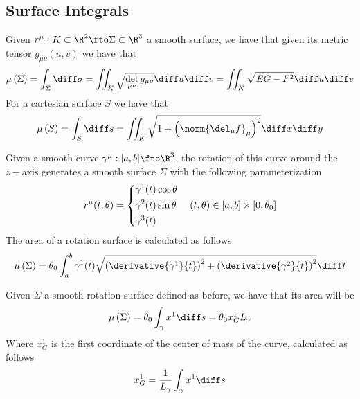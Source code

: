 \documentclass[../mmf.tex]{subfiles}
\begin{document}
\subsection{Surface Integrals}
\begin{dfn}
	Given $r^\mu:K\subset\R^2\fto\Sigma\subset\R^3$ a smooth surface, we have that given its metric tensor $g_{\mu\nu}(u,v)$ we have that
	\begin{equation}
		\mu\left( \Sigma \right)=\int_{\Sigma}^{}\diff\sigma=\iint_K\sqrt{\det_{\mu\nu}g_{\mu\nu}}\diff u\diff v=\iint_K\sqrt{EG-F^2}\diff u\diff v
		\label{eq:measuresurface}
	\end{equation}
	For a cartesian surface $S$ we have that
	\begin{equation}
		\mu\left( S \right)=\int_{S}^{}\diff s=\iint_K\sqrt{1+\left(\norm{\del_\mu f}_\mu\right)^2}\diff x\diff y
		\label{eq:cartesiansurf}
	\end{equation}
\end{dfn}
\begin{dfn}
	Given a smooth curve $\gamma^\mu:[a,b]\fto\R^3$, the rotation of this curve around the $z-$axis generates a smooth surface $\Sigma$ with the following parameterization
	\begin{equation}
		r^\mu(t,\theta)=\begin{dcases}\gamma^1(t)\cos\theta\\\gamma^2(t)\sin\theta\\\gamma^3(t)\end{dcases}\quad(t,\theta)\in[a,b]\times[0,\theta_0]
		\label{eq:rotationsurf}
	\end{equation}
	The area of a rotation surface is calculated as follows
	\begin{equation}
		\mu\left( \Sigma \right)=\theta_0\int_a^b\gamma^1(t)\sqrt{\left( \derivative{\gamma^1}{t} \right)^2+\left( \derivative{\gamma^2}{t} \right)^2}\diff t
		\label{eq:rotationsurfarea}
	\end{equation}
\end{dfn}
\begin{thm}[Guldino II]
	Given $\Sigma$ a smooth rotation surface defined as before, we have that its area will be
	\begin{equation}
		\mu\left( \Sigma \right)=\theta_0\int_\gamma x^1\diff s=\theta_0 x_G^1L_\gamma
		\label{eq:rotationsurfguldino}
	\end{equation}
	Where $x_G^1$ is the first coordinate of the center of mass of the curve, calculated as follows
	\begin{equation*}
		x_G^1=\frac{1}{L_\gamma}\int_\gamma x^1\diff s
	\end{equation*}
\end{thm}
\end{document}
